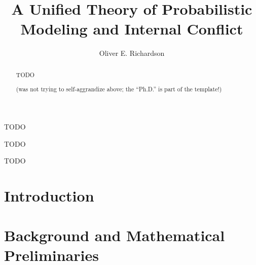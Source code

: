 \documentclass[tocprelim,
    ]{cornellmodified}
\title {%
    A Unified Theory of Probabilistic Modeling and Internal Conflict
}
\author {Oliver E. Richardson}
\begin{document}
\maketitle
\makecopyright

\begin{abstract}
TODO

(was not trying to self-aggrandize above; the ``Ph.D.'' is part of the template!)
\end{abstract}

\begin{biosketch}
TODO
\end{biosketch}

\begin{dedication}
TODO
\end{dedication}

\begin{acknowledgements}
TODO


\end{acknowledgements}

\contentspage
\figurelistpage

\normalspacing \setcounter{page}{1} 
\pagestyle{cornell} \addtolength{\parskip}{0.5\baselineskip}


\chapter{Introduction}
    
\chapter{Background and Mathematical Preliminaries}
    
\end{document}
